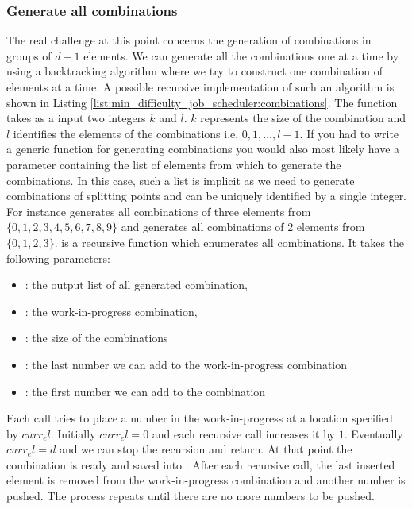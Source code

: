 \subsubsection{Generate all combinations}
The real challenge at this point concerns the generation of combinations in groups of $d-1$
elements. We can generate all the combinations one at a time by using a backtracking algorithm where
we try to construct one combination of elements at a time. A possible recursive implementation of
such an algorithm is shown in Listing \ref{list:min_difficulty_job_scheduler:combinations}. The
function  takes as a input two integers $k$ and $l$. $k$ represents
the size of the combination and $l$ identifies the elements of the combinations i.e. $0,1,\ldots,
l-1$. If you had to write a generic function for generating combinations you would also most likely
have a parameter containing the list of elements from which to generate the combinations. In this
case, such a list is implicit as we need to generate combinations of splitting points and can be
uniquely identified by a single integer. For instance 
generates all combinations of three elements from $\{0,1,2,3,4,5,6,7,8,9\}$ and
 generates all combinations of $2$ elements from
$\{0,1,2,3\}$.  is a recursive function which enumerates all
combinations. It takes the following parameters:
\begin{itemize}
    \item {}: the output list of all
    generated combination,
    \item {}: the work-in-progress combination,
    \item {}: the size of the combinations
    \item {}: the last number we can add to the work-in-progress combination
    \item {}: the first number we can add to the combination
\end{itemize}
Each call tries to place a number  in the work-in-progress  at a location
specified by $curr_el$. Initially $curr_el = 0$ and each recursive call increases it by $1$.
Eventually $curr_el = d$ and we can stop the recursion and return. At that point the combination is
ready and saved into . After each recursive call, the last inserted element
is removed from the work-in-progress combination and another number is pushed. The process repeats
until there are no more numbers to be pushed.

